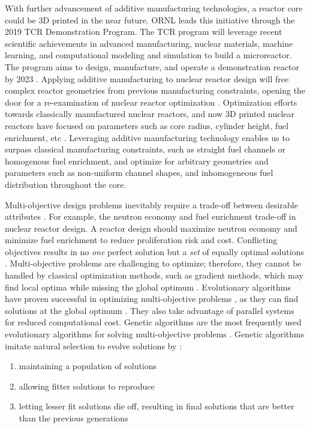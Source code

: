 With further advancement of additive manufacturing technologies, a reactor 
core could be 3D printed in the near future. 
\gls{ORNL} leads this initiative through the 2019 \gls{TCR} Demonstration 
Program. 
The \gls{TCR} program will leverage recent scientific achievements in advanced 
manufacturing, nuclear materials, machine learning, and computational modeling 
and simulation to build a microreactor. 
The program aims to design, manufacture, and operate a demonstration reactor 
by 2023 \cite{terrani_transformational_2019}. 
Applying additive manufacturing to nuclear reactor design will free complex 
reactor geometries from previous manufacturing constraints,
opening the door for a re-examination of nuclear reactor optimization 
\cite{sobes_artificial_2020}. 
Optimization efforts towards classically manufactured nuclear reactors, and now
3D printed nuclear reactors have focused on parameters such as core radius, 
cylinder height, fuel enrichment, etc 
\cite{sobes_artificial_2020,sacco_two_2006,kumar_new_2015,pereira_parallel_2008}. 
Leveraging additive manufacturing technology enables us to surpass classical 
manufacturing constraints, such as straight fuel channels or homogenous fuel 
enrichment, and optimize for arbitrary geometries and parameters 
such as non-uniform channel shapes, and inhomogeneous fuel distribution throughout 
the core. 

Multi-objective design problems inevitably require a trade-off between 
desirable attributes \cite{byrne_evolving_2014,simon_sciences_2019}. 
For example, the neutron economy and fuel enrichment trade-off in nuclear 
reactor design. 
A reactor design should maximize neutron economy and minimize fuel enrichment 
to reduce proliferation risk and cost. 
Conflicting objectives results in no \textit{one} perfect solution but 
a \textit{set} of equally optimal solutions \cite{byrne_evolving_2014}.
Multi-objective problems are challenging to optimize; therefore, they cannot be 
handled by classical optimization methods, such as gradient methods, which may 
find local optima while missing the global optimum \cite{renner_genetic_2003}. 
Evolutionary algorithms have proven successful in optimizing multi-objective problems 
\cite{krish_practical_2011}, as they can find solutions at the global 
optimum \cite{renner_genetic_2003}.
They also take advantage of parallel systems for reduced computational cost.
Genetic algorithms are the most frequently used evolutionary algorithms for 
solving multi-objective problems \cite{byrne_evolving_2014, krish_practical_2011}.
Genetic algorithms imitate natural selection to evolve solutions by 
\cite{renner_genetic_2003}: 
\begin{enumerate}
    \item maintaining a population of solutions
    \item allowing fitter solutions to reproduce
    \item letting lesser fit solutions die off, resulting in final solutions that are 
    better than the previous generations
\end{enumerate} 

